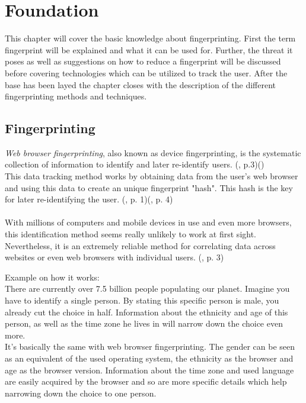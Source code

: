 \chapter{Foundation}
\label{cha:foundation}
This chapter will cover the basic knowledge about fingerprinting. First the term fingerprint will be explained and what it can be used for. Further, the threat it poses as well as suggestions on how to reduce a fingerprint will be discussed before covering technologies which can be utilized to track the user. After the base has been layed the chapter closes with the description of the different fingerprinting methods and techniques.

\section{Fingerprinting}
\textit{Web browser fingerprinting}, also known as device fingerprinting, is the systematic collection of information to identify and later re-identify users. (\textcite{doty18}, p.3)(\textcite{amiunique})\\
This data tracking method works by obtaining data from the user's web browser and using this data to create an unique fingerprint "hash". This hash is the key for later re-identifying the user. (\textcite{upi15}, p. 1)(\textcite{havens16}, p. 4)\\\\
With millions of computers and mobile devices in use and even more browsers, this identification method seems really unlikely to work at first sight. Nevertheless, it is an extremely reliable method for correlating data across websites or even web browsers with individual users. (\textcite{havens16}, p. 3)\\
\begin{tcolorbox}
	Example on how it works:\\
	There are currently over 7.5 billion people populating our planet. Imagine you have to identify a single person. By stating this specific person is male, you already cut the choice in half. Information about the ethnicity and age of this person, as well as the time zone he lives in will narrow down the choice even more.\\
	It's basically the same with web browser fingerprinting. The gender can be seen as an equivalent of the used operating system, the ethnicity as the browser and age as the browser version. Information about the time zone and used language are easily acquired by the browser and so are more specific details which help narrowing down the choice to one person.
\end{tcolorbox}

